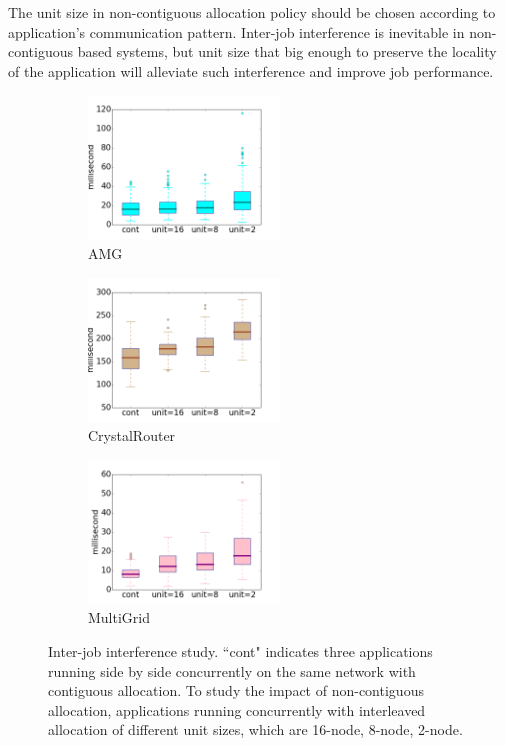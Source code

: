 \documentclass[conference]{IEEEtran}
\begin{document}
The unit size in non-contiguous allocation policy should be chosen according to application's communication pattern. Inter-job interference is inevitable in non-contiguous based systems, but unit size that big enough to preserve the locality of the application will alleviate such interference and improve job performance. 



\begin{figure}[t!]
    \centering
    \begin{subfigure}[t]{0.32\textwidth}
        \centering
        \includegraphics[height=1.5in]{figs/inter-job/amg}
        \caption{AMG}
        \label{fig:interjob-amg-box}
    \end{subfigure}%
    \hspace{1em}%
    \begin{subfigure}[t]{0.32\textwidth}
        \centering
        \includegraphics[height=1.5in]{figs/inter-job/cr}
        \caption{CrystalRouter}
        \label{fig:interjob-cr-box}
    \end{subfigure}%
    \begin{subfigure}[t]{0.32\textwidth}
        \centering
        \includegraphics[height=1.5in]{figs/inter-job/mg}
        \caption{MultiGrid}
        \label{fig:interjob-mg-box}
    \end{subfigure}%
   \caption{Inter-job interference study. ``cont" indicates three applications running side by side concurrently on the same network with contiguous allocation. To study the impact of non-contiguous allocation, applications running concurrently with interleaved allocation of different unit sizes, which are 16-node, 8-node, 2-node. }
   \label{fig: 3apps interjob study}
\end{figure}
\end{document}
